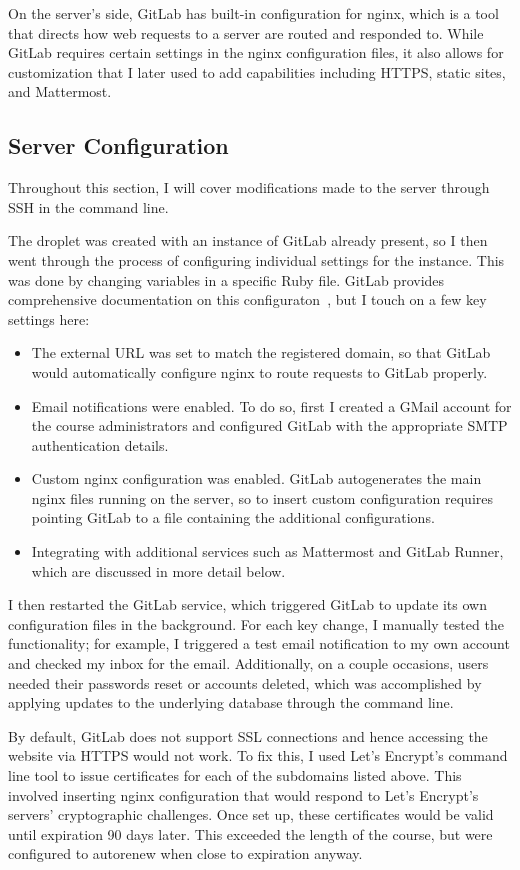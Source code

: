 \documentclass[12pt,twoside,vi]{mitthesis}
\begin{document}
{On the server's side, GitLab has built-in configuration for nginx, which is a tool that directs how web requests to a server are routed and responded to. While GitLab requires certain settings in the nginx configuration files, it also allows for customization that I later used to add capabilities including HTTPS, static sites, and Mattermost.

\subsection{Server Configuration}

Throughout this section, I will cover modifications made to the server through SSH in the command line.

The droplet was created with an instance of GitLab already present, so I then went through the process of configuring individual settings for the instance. This was done by changing variables in a specific Ruby file. GitLab provides comprehensive documentation on this configuraton~\cite{gitlabdocs}, but I touch on a few key settings here:
\begin{itemize}
\item The external URL was set to match the registered domain, so that GitLab would automatically configure nginx to route requests to GitLab properly.
\item Email notifications were enabled. To do so, first I created a GMail account for the course administrators and configured GitLab with the appropriate SMTP authentication details. 
\item Custom nginx configuration was enabled. GitLab autogenerates the main nginx files running on the server, so to insert custom configuration requires pointing GitLab to a file containing the additional configurations.
\item Integrating with additional services such as Mattermost and GitLab Runner, which are discussed in more detail below.
\end{itemize}
I then restarted the GitLab service, which triggered GitLab to update its own configuration files in the background. For each key change, I manually tested the functionality; for example, I triggered a test email notification to my own account and checked my inbox for the email. Additionally, on a couple occasions, users needed their passwords reset or accounts deleted, which was accomplished by applying updates to the underlying database through the command line.

By default, GitLab does not support SSL connections and hence accessing the website via HTTPS would not work. To fix this, I used Let's Encrypt's command line tool to issue certificates for each of the subdomains listed above. This involved inserting nginx configuration that would respond to Let's Encrypt's servers' cryptographic challenges. Once set up, these certificates would be valid until expiration 90 days later. This exceeded the length of the course, but were configured to autorenew when close to expiration anyway. 

}
\end{document}
